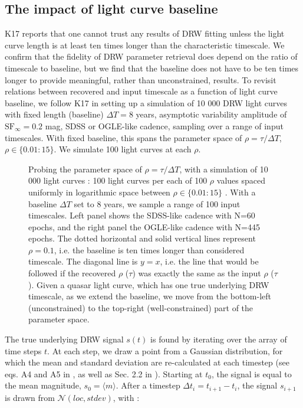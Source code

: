 \documentclass[twocolumn]{aastex62}
\begin{document}
\subsection{The impact of light curve baseline}\label{sec:baseline}

K17 reports that one cannot trust any results of DRW fitting unless the light curve length is at least ten times longer than the characteristic timescale.  We confirm that the fidelity of DRW parameter retrieval does depend on the ratio of timescale to baseline, but we find that the baseline does not have to be ten times longer to provide meaningful, rather than unconstrained, results. To revisit relations between recovered and input timescale as a function of light curve baseline, we follow K17 in setting up a simulation of 10 000  DRW light curves with fixed length (baseline) $\Delta T=8$ years, asymptotic variability amplitude of  $\mathrm{SF}_{\infty} = 0.2$ mag, SDSS or OGLE-like cadence, sampling over a range of input timescales. With fixed baseline, this spans the parameter space of $\rho = \tau / \Delta T$, $\rho \in   \{ 0.01 : 15\}$. We simulate 100 light curves at each $\rho$. 

\begin{figure*}  %
\caption{Probing the parameter space of $\rho = \tau / \Delta T$, with a simulation of  10 000 light curves : 100 light curves per each of 100 $\rho$ values spaced uniformly in logarithmic space between $\rho \in   \{ 0.01 : 15\}$ . With a baseline $\Delta T$ set to 8 years,  we sample a range of 100 input timescales. Left panel shows the SDSS-like cadence with N=60 epochs, and the right panel the OGLE-like cadence with N=445 epochs. The dotted horizontal and solid vertical lines represent $\rho = 0.1$, i.e. the baseline is ten times longer than considered timescale. The diagonal line is $y=x$, i.e. the line that would be followed if the recovered  $\rho$ ($\tau$) was exactly the same as the input $\rho$ ($\tau$). Given a quasar light curve, which has one true underlying DRW timescale,  as we extend the baseline, we move from the bottom-left (unconstrained) to the top-right (well-constrained) part of the parameter space. } 
\label{fig:rho_space}
\end{figure*}


The true underlying DRW signal $s(t)$ is found by iterating over the array of time steps $t$.  At each step, we draw a point from a Gaussian distribution, for which the mean and standard deviation are re-calculated at each timestep (see eqs. A4 and A5 in \citealt{kelly2009}, as well as Sec. 2.2 in \citealt{macleod2010}). Starting at $t_{0}$, the signal is equal to the mean magnitude, $s_{0} = \langle m \rangle$. After a timestep $\Delta t_{i} = t_{i+1} - t_{i}$, the signal $s_{i+1}$ is drawn from  $\mathcal{N}(loc, stdev)$, with : 
\end{document}
